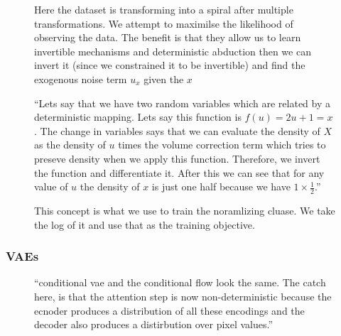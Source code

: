 \documentclass[11pt]{article}
\begin{document}
\begin{figure}[H]
    \centering
    \caption{Here the dataset is transforming into a spiral after multiple transformations. We attempt to maximilse the likelihood of observing the data. The benefit is that they allow us to learn invertible mechanisms and deterministic abduction then we can invert it (since we constrained it to be invertible) and find the exogenous noise term $u_x$ given the $x$}
\end{figure}

\begin{figure}[H]
    \centering
    \caption{``Lets say that we have two random variables which are related by a deterministic mapping. Lets say this function is $f(u)=2u+1=x$. The change in variables says that we can evaluate the density of $X$ as the density of $u$ times the volume correction term which tries to preseve density when we apply this function. Therefore, we invert the function and differentiate it. After this we can see that for any value of $u$ the density of $x$ is just one half because we have $1 \times \frac 1 2$.''}
\end{figure}

\begin{figure}[H]
    \centering
    \caption{This concept is what we use to train the noramlizing cluase. We take the log of it and use that as the training objective.}
\end{figure}

\subsubsection{VAEs}

\begin{figure}[H]
    \centering
    \caption{``conditional vae and the conditional flow look the same. The catch here, is that the attention step is now non-deterministic because the ecnoder produces a distribution of all these encodings and the decoder also produces a distirbution over pixel values.''}
\end{figure}
\end{document}
